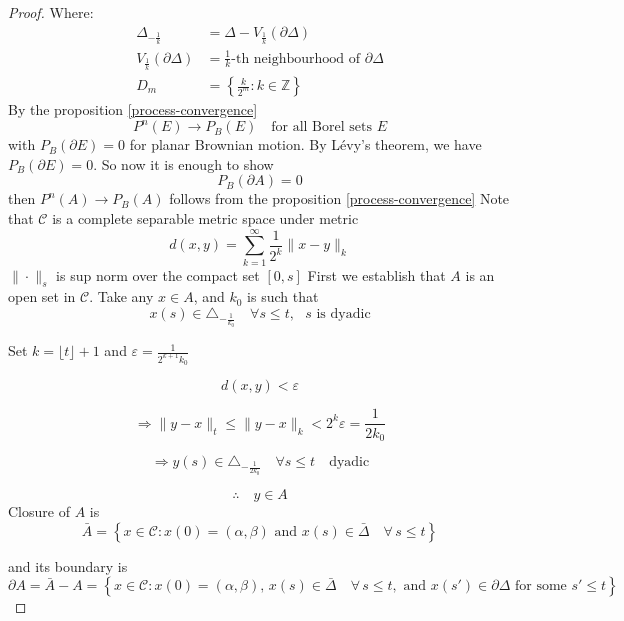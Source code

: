 \documentclass[11pt, a4paper, oneside]{report}
\numberwithin{equation}{section}
\begin{document}
\begin{proof}
Where:
\begin{align*}
    \Delta_{-\frac{1}{k}} &= \Delta - V_{\frac{1}{k}}(\partial \Delta) \\
    V_{\frac{1}{k}}(\partial \Delta) &= \text{$\frac{1}{k}$-th neighbourhood of } \partial \Delta \\
    D_m &= \left\{ \frac{k}{2^m} \colon k \in \mathbb{Z} \right\}
\end{align*}
By the proposition \ref{process-convergence}
\[
P^n(E) \to P_B(E) \quad \text{for all Borel sets } E
\]
with $P_B(\partial E) = 0$ for planar Brownian motion.
By Lévy's theorem, we have $P_B(\partial E) = 0$.
So now it is enough to show 
\[
P_B(\partial A) = 0
\]
then \(P^n(A) \to P_B(A) \) follows from the proposition \ref{process-convergence}
Note that $\mathcal{C}$ is a complete separable metric space under metric
\[
d(x,y) = \sum_{k=1}^{\infty} \frac{1}{2^k} {\|x - y\|_k}
\]
$\| \cdot \|_s$ is sup norm over the compact set $[0, s]$
First we establish that $A$ is an open set in $\mathcal{C}$.
Take any $x \in A$, and $k_0$ is such that 
\[
x(s) \in \triangle_{-\frac{1}{k_0}} \quad \forall s \le t, \text{ $s$ is dyadic}
\]

Set $k = \lfloor t \rfloor + 1$ and $\varepsilon = \frac{1}{2^{k+1}k_0}$

\[
d(x, y) < \varepsilon
\]

\[
\Rightarrow \|y - x\|_t \le \|y - x\|_k < 2^k \varepsilon = \frac{1}{2k_0}
\]

\[
\Rightarrow y(s) \in \triangle_{- \frac{1}{2k_0}} \quad \forall s \le t \quad \text{dyadic}
\]

\[
\therefore \quad y \in A
\]
Closure of \( A \) is
\[
\bar{A} = \left\{ x \in \mathcal{C} : x(0) = (\alpha, \beta) \text{ and } x(s) \in \bar{\Delta} \quad \forall\, s \leq t \right\}
\]

and its boundary is
\[
\partial A = \bar{A} - A 
= \left\{ x \in \mathcal{C} : x(0) = (\alpha, \beta),\, x(s) \in \bar{\Delta} \quad \forall\, s \leq t, \text{ and } x(s') \in \partial \Delta \text{ for some } s' \leq t \right\}
\]


\end{proof}
\end{document}
